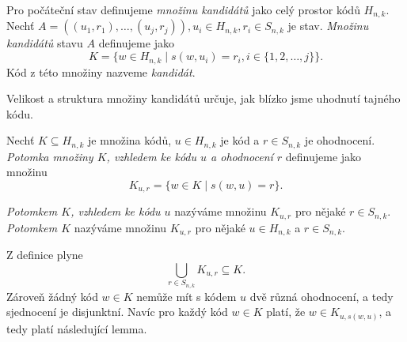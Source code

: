 \begin{definice}\label{kandidat}
  Pro počáteční stav definujeme \emph{množinu kandidátů} jako celý prostor kódů $H_{n,k}$. Nechť $A = \left((u_1, r_1), \dots, (u_j,r_j)\right), u_i \in H_{n,k}, r_i \in S_{n,k}$ je stav. \emph{Množinu kandidátů} stavu $A$ definujeme jako
  \[K = \{w \in H_{n,k} \mid s(w,u_i) = r_i,  i \in \{1,2,\dots ,j\} \}.\]
  Kód z této množiny nazveme \emph{kandidát}. 
  

\end{definice}
Velikost a struktura množiny kandidátů určuje, jak blízko jsme uhodnutí tajného kódu.
\begin{definice}\label{defpotomekmnoziny}
  Nechť $K \subseteq H_{n,k}$ je množina kódů, $u \in H_{n,k}$ je kód a $r \in S_{n,k}$ je ohodnocení. \emph{Potomka množiny $K$, vzhledem ke kódu $u$ a ohodnocení $r$} definujeme jako množinu 
  \[K_{u,r} = \{w \in K \mid s(w,u) = r\}.\] 
\end{definice}
\begin{pozn}
    \emph{Potomkem $K$, vzhledem ke kódu $u$} nazýváme množinu $K_{u,r}$ pro nějaké $r \in S_{n,k}$. \emph{Potomkem $K$} nazýváme množinu $K_{u,r}$ pro nějaké $u\in H_{n,k}$ a $r \in S_{n,k}$. 
\end{pozn}
Z definice plyne
\[\bigcup_{r\in S_{n,k}} K_{u,r} \subseteq K.\] Zároveň žádný kód $w \in K$ nemůže mít s kódem $u$ dvě různá ohodnocení, a tedy sjednocení je disjunktní. Navíc pro každý kód $w \in K$ platí, že $w \in K_{u, s(w,u)}$, a tedy platí následující lemma.

